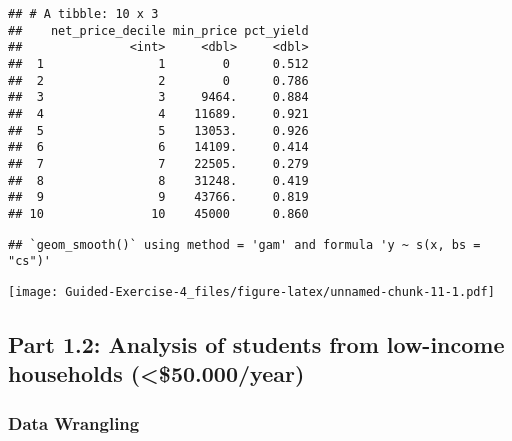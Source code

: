 \documentclass[
]{article}
\newenvironment{Shaded}{\begin{snugshade}}{\end{snugshade}}
\newcommand{\AttributeTok}[1]{\textcolor[rgb]{0.77,0.63,0.00}{#1}}
\newcommand{\FunctionTok}[1]{\textcolor[rgb]{0.00,0.00,0.00}{#1}}
\newcommand{\NormalTok}[1]{#1}
\newcommand{\SpecialCharTok}[1]{\textcolor[rgb]{0.00,0.00,0.00}{#1}}
\newcommand{\StringTok}[1]{\textcolor[rgb]{0.31,0.60,0.02}{#1}}
\begin{document}
\begin{verbatim}
## # A tibble: 10 x 3
##    net_price_decile min_price pct_yield
##               <int>     <dbl>     <dbl>
##  1                1        0      0.512
##  2                2        0      0.786
##  3                3     9464.     0.884
##  4                4    11689.     0.921
##  5                5    13053.     0.926
##  6                6    14109.     0.414
##  7                7    22505.     0.279
##  8                8    31248.     0.419
##  9                9    43766.     0.819
## 10               10    45000      0.860
\end{verbatim}

\begin{Shaded}
\end{Shaded}

\begin{verbatim}
## `geom_smooth()` using method = 'gam' and formula 'y ~ s(x, bs = "cs")'
\end{verbatim}

\texttt{[image: Guided-Exercise-4\_files/figure-latex/unnamed-chunk-11-1.pdf]}

\hypertarget{part-1.2-analysis-of-students-from-low-income-households-50.000year}{%
\subsection{Part 1.2: Analysis of students from low-income households
(\textless\$50.000/year)}\label{part-1.2-analysis-of-students-from-low-income-households-50.000year}}

\hypertarget{data-wrangling}{%
\subsubsection{Data Wrangling}\label{data-wrangling}}
\end{document}

